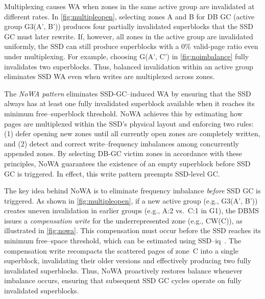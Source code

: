 Multiplexing causes WA when zones in the same active group are invalidated at different rates.
In \cref{fig:multipleopen}, selecting zones A and B for DB GC (active group G3(A', B')) produces four partially invalidated superblocks that the SSD GC must later rewrite.
If, however, all zones in the active group are invalidated uniformly, the SSD can still produce superblocks with a 0\% valid-page ratio even under multiplexing.
For example, choosing G(A', C') in \cref{fig:noimbalance} fully invalidates two superblocks.
Thus, balanced invalidation within an active group eliminates SSD WA even when writes are multiplexed across zones.

The \emph{NoWA pattern} eliminates SSD-GC--induced WA by ensuring that the SSD always has at least one fully invalidated superblock available when it reaches its minimum free--superblock threshold.
NoWA achieves this by estimating how pages are multiplexed within the SSD’s physical layout and enforcing two rules:
(1) defer opening new zones until all currently open zones are completely written, and
(2) detect and correct write--frequency imbalances among concurrently appended zones.
By selecting DB-GC victim zones in accordance with these principles, NoWA guarantees the existence of an empty superblock before SSD GC is triggered.
In effect, this write pattern preempts SSD-level GC.

The key idea behind NoWA is to eliminate frequency imbalance \emph{before} SSD GC is triggered.
As shown in \cref{fig:multipleopen}, if a new active group (e.g., G3(A', B')) creates uneven invalidation in earlier groups (e.g., A:2 vs.\ C:1 in G1),
the DBMS issues a \emph{compensation write} for the underrepresented zone (e.g., CW(C)), as illustrated in \cref{fig:nowa}.
This compensation must occur before the SSD reaches its minimum free--space threshold, which can be estimated using SSD--iq~\cite{ssdiq}.
The compensation write recompacts the scattered pages of zone~C into a single superblock, invalidating their older versions and effectively producing two fully invalidated superblocks.
Thus, NoWA proactively restores balance whenever imbalance occurs, ensuring that subsequent SSD GC cycles operate on fully invalidated superblocks.

